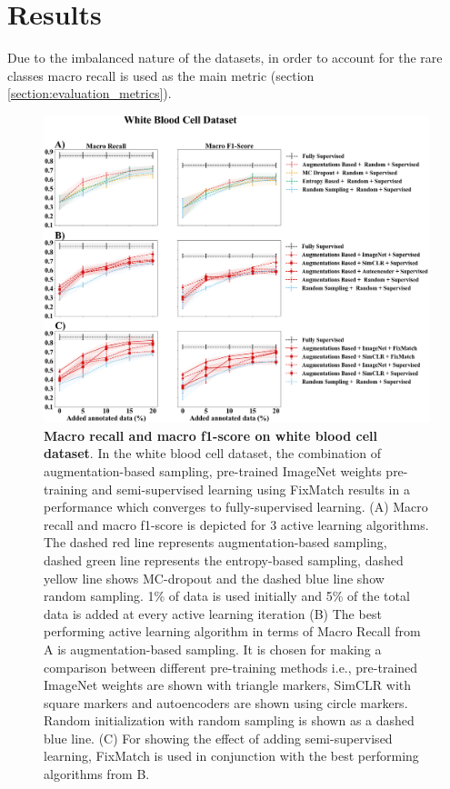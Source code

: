 
\chapter{Results}\label{chapter:results}

Due to the imbalanced nature of the datasets, in order to account for the rare classes macro recall is used as the main metric (section \ref{section:evaluation_metrics}).

\begin{figure}[htbp]
\centering
\captionsetup{format=plain}
\includegraphics[width=\textwidth]{figures/fig_2_white_recall_f1.png}
\caption[Macro recall and macro f1-score on white blood cell dataset]{\textbf{Macro recall and macro f1-score on white blood cell dataset}. In the white blood cell dataset, the combination of augmentation-based sampling, pre-trained ImageNet weights pre-training and semi-supervised learning using FixMatch results in a performance which converges to fully-supervised learning. (A) Macro recall and macro f1-score is depicted for 3 active learning algorithms. The dashed red line represents augmentation-based sampling, dashed green line represents the entropy-based sampling, dashed yellow line shows MC-dropout and the dashed blue line show random sampling. 1\% of data is used initially and 5\% of the total data is added at every active learning iteration (B) The best performing active learning algorithm in terms of Macro Recall from A is augmentation-based sampling. It is chosen for making a comparison between different pre-training methods i.e., pre-trained ImageNet weights are shown with triangle markers, SimCLR with square markers and autoencoders are shown using circle markers. Random initialization with random sampling is shown as a dashed blue line. (C) For showing the effect of adding semi-supervised learning, FixMatch is used in conjunction with the best performing algorithms from B.}
\label{fig:fig_2_white_recall_f1}
\end{figure}


